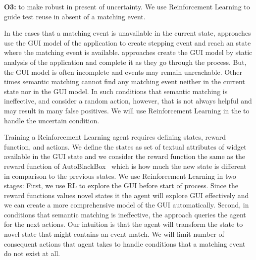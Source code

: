 \bigskip
\noindent
\textbf{O3:} to make \testreuse robust in present of uncertainty. We use Reinforcement Learning to guide test reuse in absent of a matching event.

\bigskip
In the cases that a matching event is unavailable in the current state, \testreuse approaches use the GUI model of the application to create stepping event and reach an state where the matching event is available. 
\testreuse approaches create the GUI model  by static analysis of the application and complete it as they go through the \testreuse process. 
But, the GUI model is often incomplete and events may remain unreachable. 
Other times semantic matching cannot find any matching event neither in the current state nor in the GUI model. 
In such conditions that semantic matching is ineffective, \atm and \adaptdroid consider a random action, however, that is not always helpful and may result in many false positives. 
We will use Reinforcement Learning in the \testreuse to handle the uncertain condition.

\bigskip
Training a Reinforcement Learning agent requires defining states, reward function, and actions.
We define the states as set of textual attributes of widget available in the GUI state and we consider the reward function the same as the reward function of AutoBlackBox~\cite{Mariani:Autoblacktest:ICSE:2011} which is  how much the new state is different in comparison to the previous states. 
%
We use Reinforcement Learning in two stages: 
First, we use RL to explore the GUI before start of \testreuse process. 
Since the reward functions values  novel states it the agent will explore GUI effectively and we can create a more comprehensive model of the GUI automatically. 
Second, in conditions that semantic matching is  ineffective, the \testreuse approach queries the agent for the next actions.
Our intuition is that the agent will transform the state to novel state that might contains an event match. 
We will limit number of consequent actions that agent takes to handle conditions that a matching event do not exist at all.


